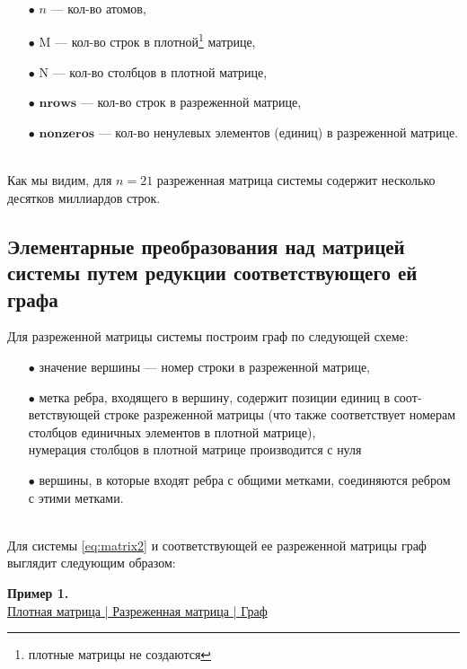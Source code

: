 \begin{itemize}
	\item[$\bullet$]{$n$  --- кол-во атомов},
	\item[$\bullet$]{$\mathrm{M}$ --- кол-во строк в плотной\footnote[1]{плотные матрицы не создаются} матрице,}
	\item[$\bullet$]{$\mathrm{N}$ --- кол-во столбцов в плотной матрице,}
	\item[$\bullet$]{$\mathbf{nrows}$  --- кол-во строк в разреженной матрице,}
	\item[$\bullet$]{$\mathbf{nonzeros}$ --- кол-во ненулевых элементов (единиц) в разреженной матрице.}
\end{itemize}
\
\\[0pt]
\noindent Как мы видим, для $n = 21$ разреженная матрица системы содержит несколько десятков миллиардов строк.

\subsection{Элементарные преобразования над матрицей системы путем редукции соответствующего ей графа}\label{subsec:ch4/subsect2}

Для разреженной матрицы системы построим граф по следующей схеме:
\begin{itemize}
	\item[$\bullet$]{значение вершины --- номер строки в разреженной матрице,}
	\item[$\bullet$]{метка ребра, входящего в вершину, содержит позиции единиц в соот­ветствующей строке разреженной матрицы (что также соответствует номерам столбцов единичных элементов в плотной матрице),\\[12pt]
	нумерация столбцов в плотной матрице производится с нуля
	}
	\item[$\bullet$]{вершины, в которые входят ребра с общими метками, соединяются реб­ром с этими метками.}
\end{itemize}
\
\\[0pt]
\indent Для системы \eqref{eq:matrix2} и соответствующей ее разреженной матрицы граф выглядит следующим образом:

\clearpage
\noindent\textbf{Пример 1.}
\\[18pt]
\underline{\hspace{1.5em} Плотная матрица \hspace{1.5em} | \hspace{1em} Разреженная матрица \hspace{1em} | \hspace{3em} Граф \hspace{3.5em}}\\

